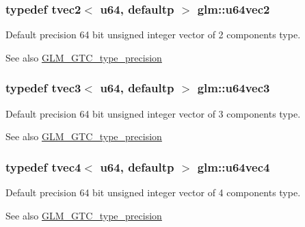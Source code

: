 \subsubsection[{u64vec2}]{\setlength{\rightskip}{0pt plus 5cm}typedef tvec2$<$ u64, defaultp $>$ {\bf glm\+::u64vec2}}\label{group__gtc__type__precision_gaddd85665767e5d32aee8516f00c45f59}
Default precision 64 bit unsigned integer vector of 2 components type. \begin{DoxySeeAlso}{See also}
\hyperlink{group__gtc__type__precision}{G\+L\+M\+\_\+\+G\+T\+C\+\_\+type\+\_\+precision} 
\end{DoxySeeAlso}
\hypertarget{group__gtc__type__precision_ga7f104c29d70170cfb2223b29f7985bd4}{}
\subsubsection[{u64vec3}]{\setlength{\rightskip}{0pt plus 5cm}typedef tvec3$<$ u64, defaultp $>$ {\bf glm\+::u64vec3}}\label{group__gtc__type__precision_ga7f104c29d70170cfb2223b29f7985bd4}
Default precision 64 bit unsigned integer vector of 3 components type. \begin{DoxySeeAlso}{See also}
\hyperlink{group__gtc__type__precision}{G\+L\+M\+\_\+\+G\+T\+C\+\_\+type\+\_\+precision} 
\end{DoxySeeAlso}
\hypertarget{group__gtc__type__precision_gadafdefd5524bf6a48bb7c47edb787ae5}{}
\subsubsection[{u64vec4}]{\setlength{\rightskip}{0pt plus 5cm}typedef tvec4$<$ u64, defaultp $>$ {\bf glm\+::u64vec4}}\label{group__gtc__type__precision_gadafdefd5524bf6a48bb7c47edb787ae5}
Default precision 64 bit unsigned integer vector of 4 components type. \begin{DoxySeeAlso}{See also}
\hyperlink{group__gtc__type__precision}{G\+L\+M\+\_\+\+G\+T\+C\+\_\+type\+\_\+precision} 
\end{DoxySeeAlso}
\hypertarget{group__gtc__type__precision_ga5e3dc67373d5068997d2d9f41c9024d2}{}
